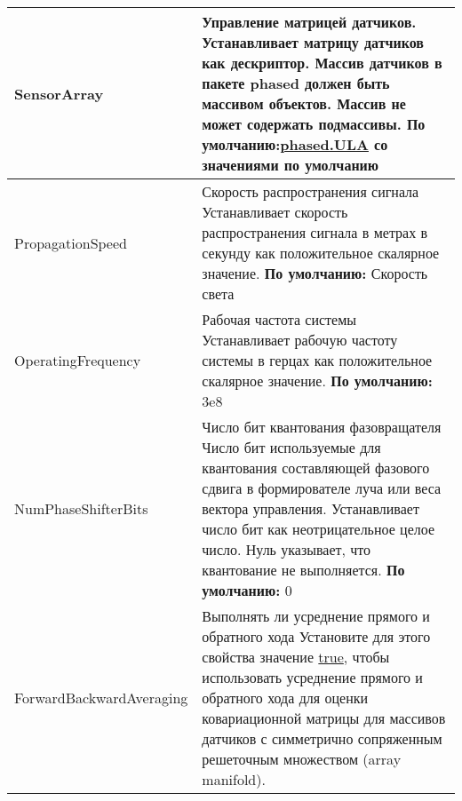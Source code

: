 \begin{longtable}{|p{6cm}|p{11cm}|} \hline
	SensorArray
	&
	Управление матрицей датчиков.
	\newline
	\newline
	Устанавливает матрицу датчиков как дескриптор. Массив датчиков в пакете phased должен быть массивом объектов. Массив не может содержать подмассивы.
	\newline
	\newline
	\textbf{По умолчанию:}\href{https://www.mathworks.com/help/phased/ref/phased.ula-class.html}%
	{phased.ULA} со значениями по умолчанию
	
	\noindent \\
	\hline
	PropagationSpeed
	&
	Скорость распространения сигнала
	\newline
	\newline
	Устанавливает скорость распространения сигнала в метрах в секунду как положительное скалярное значение.
	\newline
	\newline
	\textbf{По умолчанию:} Скорость света \\
	\hline
	OperatingFrequency
	&
	Рабочая частота системы
	\newline
	\newline
	Устанавливает рабочую частоту системы в герцах как положительное скалярное значение.
	\newline
	\newline
	\textbf{По умолчанию:} 3e8 \\
	\hline
	NumPhaseShifterBits
	&
	Число бит квантования фазовращателя
	\newline
	\newline
	Число бит используемые для квантования составляющей фазового сдвига в формирователе луча или веса вектора управления. Устанавливает число бит как неотрицательное целое число. Нуль указывает, что квантование не выполняется.
	\newline
	\newline
	\textbf{По умолчанию:} 0 \\
	\hline
	ForwardBackwardAveraging
	&
	Выполнять ли усреднение прямого и обратного хода
	\newline
	\newline
	Установите для этого свойства значение \underline{true}, чтобы использовать усреднение прямого и обратного хода для оценки ковариационной матрицы для массивов датчиков с симметрично сопряженным решеточным множеством (array manifold).
	\newline

\end{longtable}
